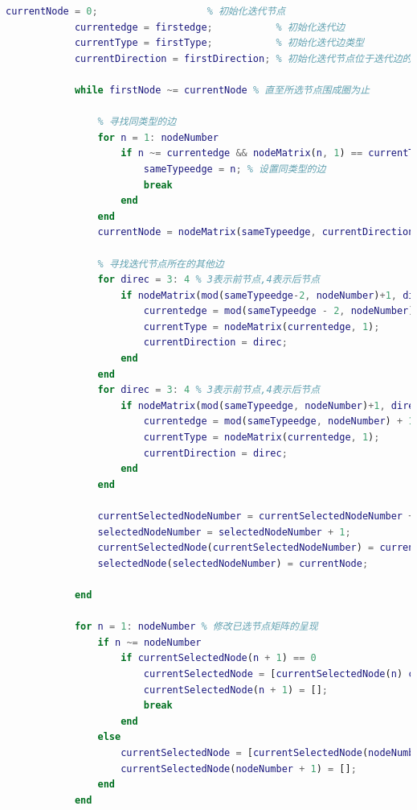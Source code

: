 \documentclass[lang = cn, scheme = chinese, thmcnt = section, usesamecnt]{elegantbook}
\begin{document}
\begin{lstlisting}[language = Matlab, caption = {节点类函数}]
	        currentNode = 0;                   % 初始化迭代节点
	        currentedge = firstedge;           % 初始化迭代边
	        currentType = firstType;           % 初始化迭代边类型
	        currentDirection = firstDirection; % 初始化迭代节点位于迭代边的方向
	    
	        while firstNode ~= currentNode % 直至所选节点围成圈为止
	            
	            % 寻找同类型的边
	            for n = 1: nodeNumber
	                if n ~= currentedge && nodeMatrix(n, 1) == currentType
	                    sameTypeedge = n; % 设置同类型的边
	                    break
	                end
	            end
	            currentNode = nodeMatrix(sameTypeedge, currentDirection); % 更新迭代节点
	            
	            % 寻找迭代节点所在的其他边
	            for direc = 3: 4 % 3表示前节点,4表示后节点
	                if nodeMatrix(mod(sameTypeedge-2, nodeNumber)+1, direc) == currentNode % 如果迭代节点为前边的节点
	                    currentedge = mod(sameTypeedge - 2, nodeNumber) + 1; % 更新迭代边
	                    currentType = nodeMatrix(currentedge, 1);            % 更新迭代边类型
	                    currentDirection = direc;                            % 更新迭代节点位于迭代边的方向
	                end
	            end
	            for direc = 3: 4 % 3表示前节点,4表示后节点
	                if nodeMatrix(mod(sameTypeedge, nodeNumber)+1, direc) == currentNode % 如果迭代节点为后边的节点
	                    currentedge = mod(sameTypeedge, nodeNumber) + 1; % % 更新迭代边
	                    currentType = nodeMatrix(currentedge, 1);        % 更新迭代边类型
	                    currentDirection = direc;                        % 更新迭代节点位于迭代边的方向
	                end 
	            end
	    
	            currentSelectedNodeNumber = currentSelectedNodeNumber + 1;    % 更新迭代已选节点数目
	            selectedNodeNumber = selectedNodeNumber + 1;                  % 更新已选节点数目
	            currentSelectedNode(currentSelectedNodeNumber) = currentNode; % 更新迭代已选节点
	            selectedNode(selectedNodeNumber) = currentNode;               % 更新已选节点
	             
	        end
	    
	        for n = 1: nodeNumber % 修改已选节点矩阵的呈现
	            if n ~= nodeNumber
	                if currentSelectedNode(n + 1) == 0
	                    currentSelectedNode = [currentSelectedNode(n) currentSelectedNode];
	                    currentSelectedNode(n + 1) = [];
	                    break
	                end
	            else
	                currentSelectedNode = [currentSelectedNode(nodeNumber) currentSelectedNode];
	                currentSelectedNode(nodeNumber + 1) = [];
	            end
	        end
	    

\end{lstlisting}
\end{document}
